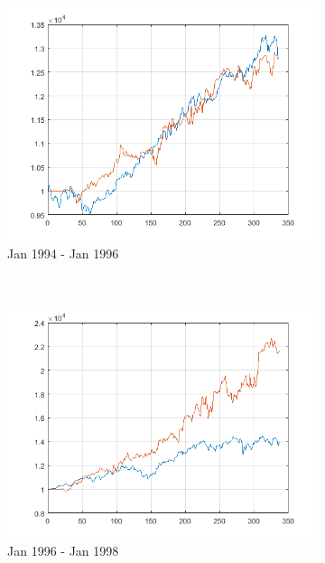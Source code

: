 \documentclass[11pt,a4,twosided,singlespacing,titlepagenumber=on]{scrreprt}
\numberwithin{equation}{chapter} %
\theoremstyle{remark}
\begin{document}
\begin{figure}[H]
\begin{subfigure}[t]{0.32\textwidth}
        \includegraphics[width=1\textwidth]{res/backtest/3}
        \caption{Jan 1994 - Jan 1996}
    \end{subfigure} \\
    \begin{subfigure}[t]{0.32\textwidth}
        \centering
        \includegraphics[width=1\textwidth]{res/backtest/4}
        \caption{Jan 1996 - Jan 1998}
    \end{subfigure}
    \begin{subfigure}[t]{0.32\textwidth}
        \centering

\end{subfigure}
\end{figure}
\end{document}
